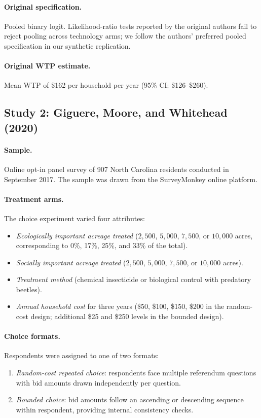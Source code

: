 \documentclass[12pt]{article}
\begin{document}
\paragraph{Original specification.} Pooled binary logit. Likelihood-ratio tests reported by the original authors fail to reject pooling across technology arms; we follow the authors' preferred pooled specification in our synthetic replication.

\paragraph{Original WTP estimate.} Mean WTP of \$162 per household per year (95\% CI: \$126--\$260).

\subsection{Study 2: Giguere, Moore, and Whitehead (2020)}

\paragraph{Sample.} Online opt-in panel survey of 907 North Carolina residents conducted in September 2017. The sample was drawn from the SurveyMonkey online platform.

\paragraph{Treatment arms.} The choice experiment varied four attributes:
\begin{itemize}[noitemsep]
    \item \textit{Ecologically important acreage treated} ($2{,}500$, $5{,}000$, $7{,}500$, or $10{,}000$ acres, corresponding to 0\%, 17\%, 25\%, and 33\% of the total).
    \item \textit{Socially important acreage treated} ($2{,}500$, $5{,}000$, $7{,}500$, or $10{,}000$ acres).
    \item \textit{Treatment method} (chemical insecticide or biological control with predatory beetles).
    \item \textit{Annual household cost} for three years (\$50, \$100, \$150, \$200 in the random-cost design; additional \$25 and \$250 levels in the bounded design).
\end{itemize}

\paragraph{Choice formats.} Respondents were assigned to one of two formats:
\begin{enumerate}[noitemsep]
    \item \textit{Random-cost repeated choice}: respondents face multiple referendum questions with bid amounts drawn independently per question.
    \item \textit{Bounded choice}: bid amounts follow an ascending or descending sequence within respondent, providing internal consistency checks.
\end{enumerate}
\end{document}
